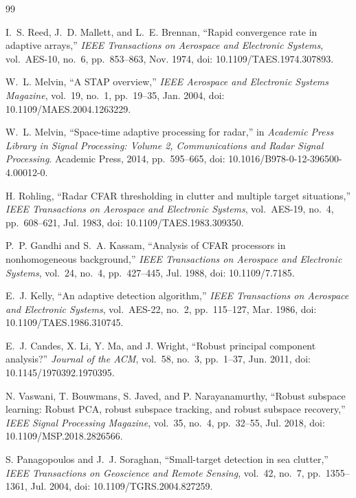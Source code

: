 \documentclass[journal]{IEEEtran}
\begin{document}
\begin{thebibliography}{99}

I.~S. Reed, J.~D. Mallett, and L.~E. Brennan, ``Rapid convergence rate in adaptive arrays,'' \emph{IEEE Transactions on Aerospace and Electronic Systems}, vol.~AES-10, no.~6, pp.~853--863, Nov. 1974, doi: 10.1109/TAES.1974.307893.

W.~L. Melvin, ``A STAP overview,'' \emph{IEEE Aerospace and Electronic Systems Magazine}, vol.~19, no.~1, pp.~19--35, Jan. 2004, doi: 10.1109/MAES.2004.1263229.

W.~L. Melvin, ``Space-time adaptive processing for radar,'' in \emph{Academic Press Library in Signal Processing: Volume 2, Communications and Radar Signal Processing}. Academic Press, 2014, pp.~595--665, doi: 10.1016/B978-0-12-396500-4.00012-0.

H. Rohling, ``Radar CFAR thresholding in clutter and multiple target situations,'' \emph{IEEE Transactions on Aerospace and Electronic Systems}, vol.~AES-19, no.~4, pp.~608--621, Jul. 1983, doi: 10.1109/TAES.1983.309350.

P.~P. Gandhi and S.~A. Kassam, ``Analysis of CFAR processors in nonhomogeneous background,'' \emph{IEEE Transactions on Aerospace and Electronic Systems}, vol.~24, no.~4, pp.~427--445, Jul. 1988, doi: 10.1109/7.7185.

E.~J. Kelly, ``An adaptive detection algorithm,'' \emph{IEEE Transactions on Aerospace and Electronic Systems}, vol.~AES-22, no.~2, pp.~115--127, Mar. 1986, doi: 10.1109/TAES.1986.310745.

E.~J. Candes, X. Li, Y. Ma, and J. Wright, ``Robust principal component analysis?'' \emph{Journal of the ACM}, vol.~58, no.~3, pp.~1--37, Jun. 2011, doi: 10.1145/1970392.1970395.

N. Vaswani, T. Bouwmans, S. Javed, and P. Narayanamurthy, ``Robust subspace learning: Robust PCA, robust subspace tracking, and robust subspace recovery,'' \emph{IEEE Signal Processing Magazine}, vol.~35, no.~4, pp.~32--55, Jul. 2018, doi: 10.1109/MSP.2018.2826566.

S. Panagopoulos and J.~J. Soraghan, ``Small-target detection in sea clutter,'' \emph{IEEE Transactions on Geoscience and Remote Sensing}, vol.~42, no.~7, pp.~1355--1361, Jul. 2004, doi: 10.1109/TGRS.2004.827259.


\end{thebibliography}
\end{document}
